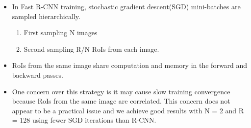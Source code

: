 \documentclass[11pt]{book}
\begin{document}
\begin{itemize}
\item In Fast R-CNN training, stochastic gradient descent(SGD) mini-batches are sampled 
      hierarchically.
\begin{enumerate}
\item First sampling N images
\item Second sampling R/N RoIs from each image.
\end{enumerate}
\item RoIs from the same image share computation and memory in the forward and backward
      passes.
\item One concern over this strategy is it may cause slow training convergence because
      RoIs from the same image are correlated. This concern does not appear to be a 
      practical issue and we achieve good results with N = 2 and R = 128 using fewer
      SGD iterations than R-CNN.
\end{itemize}
\end{document}
